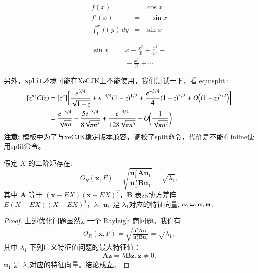 \begin{eqnarray}
f(x) & = & \cos x \\ 
f'(x) & = & -\sin x \\ 
\int_{0}^{x} f(y)\,dy & = & \sin x 
\end{eqnarray} 

{\setlength\arraycolsep{2pt} 
\begin{eqnarray} 
\sin x & = & x -\frac{x^{3}}{3!} +\frac{x^{5}}{5!}-{} \nonumber\\ 
	& & {}-\frac{x^{7}}{7!}+{}\cdots 
\end{eqnarray}} 

另外，\texttt{split}环境可能在XeCJK上不能使用，我们测试一下，看\ref{equ:split}:
\begin{equation}\label{equ:split}
\begin{split}
[z^n]C(z) &= [z^n] \biggl[\frac{e^{3/4}}{\sqrt{1-z}} +
e^{-3/4}(1-z)^{1/2} + \frac{e^{-3/4}}{4}(1-z)^{3/2}
+ O\Bigl( (1-z)^{5/2}\Bigr)\biggr] \\
&= \frac{e^{-3/4}}{\sqrt{\pi n}} - \frac{5e^{-3/4}}{8\sqrt{\pi
n^3}} + \frac{e^{-3/4}}{128 \sqrt{\pi n^5}} +
O\biggl(\frac{1}{\sqrt{\pi
n^7}}\biggr)
\end{split}
\end{equation}
\textbf{注意:} 模板中为了与xeCJK稳定版本兼容，调校了split命令，代价是不能在inline使用split命令。

\begin{theorem}
  \label{chapTSthm:rayleigh solution}
  假定 $X$ 的二阶矩存在:
  \begin{equation}
         O_R(\textbf{x},F)=\sqrt{\frac{\textbf{u}_1^T\textbf{A}\textbf{u}_1} {\textbf{u}_1^T\textbf{B}\textbf{u}_1}}=\sqrt{\lambda_1},
  \end{equation}
  其中 $\textbf{A}$ 等于 $(\textbf{x}-EX)(\textbf{x}-EX)^T$，\textbf{B} 表示协方差阵 $E(X-EX)(X-EX)^T$，$\lambda_1$
$\textbf{u}_1$ 是 $\lambda_1$对应的特征向量, $\omega,\ve{\omega},\omegaup,\ve{\omegaup}$.
\end{theorem}

\begin{proof}
 上述优化问题显然是一个 Rayleigh 商问题。我们有
  \begin{align}
     O_R(\textbf{x},F)=\sqrt{\frac{\textbf{u}_1^T\textbf{A}\textbf{u}_1} {\textbf{u}_1^T\textbf{B}\textbf{u}_1}}=\sqrt{\lambda_1},
 \end{align}
 其中 $\lambda_1$ 下列广义特征值问题的最大特征值：
$$
\textbf{A}\textbf{z}=\lambda\textbf{B}\textbf{z}, \textbf{z}\neq 0.
$$
 $\textbf{u}_1$ 是 $\lambda_1$对应的特征向量。结论成立。
\end{proof}

